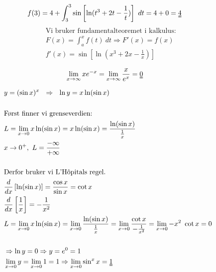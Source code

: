 
\newpage
{}
\oppgaveDelStart
{}
\begin{align*}
&f(3) = 4 + \int_3^3 \sin \left[ \ln(t^3+2t-\frac{1}{t}) \right] \ dt = 4 + 0 = \uuline{4}
\end{align*}
\begin{align*}
&\text{Vi bruker fundamentalteoremet i kalkulus:}\\
&F(x) = \int_a^x f(t) \ dt \Rightarrow F'(x) = f(x)\\
&f'(x) = \sin \left[ \ln(x^3+2x-\frac{1}{x}) \right]
\end{align*}
\oppgaveDelSlutt


\oppgaveDelStart
{}
\begin{align*}
&\lim_{x\to\infty} xe^{-x} = \lim_{x\to\infty} \frac{x}{e^x} = \uuline{0}
\end{align*}

\begin{align*}
&y = (\sin x)^x \ \ \Rightarrow \ \ \ln y = x \ln (\sin x)\\\\
&\text{Først finner vi grenseverdien:}\\
&L = \lim_{x\to0} x \ln(\sin x) = x \ln(\sin x) = \frac{\ln(\sin x)}{\frac{1}{x}}\\
&x\to 0^+, \ L = \frac{-\infty}{+\infty}\\\\
&\text{Derfor bruker vi L'Hôpitals regel.}\\
&\frac{d}{dx} \left[ \ln(\sin x) \right] = \frac{\cos x}{\sin x} = \cot x\\
&\frac{d}{dx} \left[ \frac{1}{x} \right] = - \frac{1}{x^2}\\
&L = \lim_{x\to0} x \ln(\sin x) = \lim_{x\to0} \frac{\ln(\sin x)}{\frac{1}{x}} = \lim_{x\to0} \frac{\cot x}{- \frac{1}{x^2}} = \lim_{x\to 0} -x^2 \ \cot x = 0\\\\
&\Rightarrow \ln y = 0 \Rightarrow y = e^0 = 1\\
&\lim_{x\to 0} y = \lim_{x \to 0} 1 = 1 \Rightarrow \lim_{x\to 0} \sin^x x = \uuline{1}
\end{align*}
\oppgaveDelSlutt

